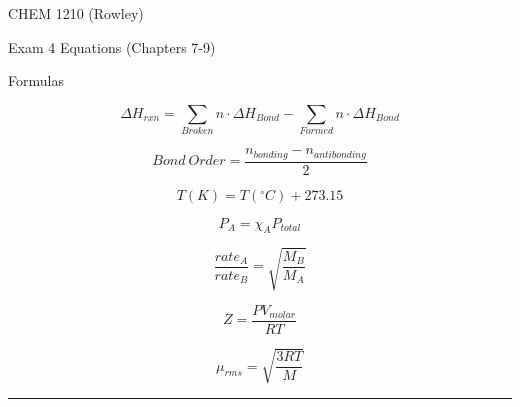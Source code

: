 \documentclass[12pt, addpoints, letterpaper]{exam}
\begin{document}
\begin{center}
	\vspace{12em}
	{\Huge CHEM 1210 (Rowley) }

	{\LARGE Exam 4 Equations (Chapters 7-9)}
\end{center}


\begin{center}
	{\large Formulas}

	\hrulefill
\end{center}

\noindent
\begin{minipage}[c][\stretch{1}][c]{0.56\linewidth}
	\begin{equation*}
		\Delta H_{rxn}=\sum\limits_{Broken} n\cdot \Delta H_{Bond} - \sum\limits_{Formed}n\cdot \Delta H_{Bond}
	\end{equation*}

	\begin{equation*}
		Bond~Order=\frac{n_{bonding}-n_{antibonding}}{2}
	\end{equation*}

	\begin{equation*}
		T(K) = T(^\circ C) + 273.15
	\end{equation*}

	\begin{equation*}
		P_A=\chi_AP_{total}
	\end{equation*}

	\begin{equation*}
		\frac{rate_A}{rate_B}=\sqrt{\dfrac{M_B}{M_A}}
	\end{equation*}

	\begin{equation*}
		Z = \frac{PV_{molar}}{RT}
	\end{equation*}

	\begin{equation*}
		\mu_{rms} = \sqrt{\frac{3RT}{M}}
	\end{equation*}
\end{minipage}
\rule[-190pt]{1.5pt}{380pt}
\end{document}

